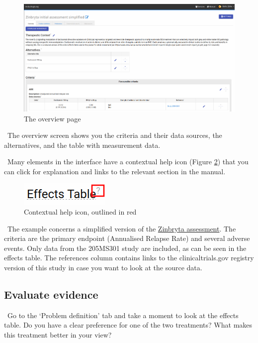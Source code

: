 \documentclass[00_mcda_tutorial.tex]{subfiles}
\begin{document}
\begin{figure}[!h]
  \centering
  \includegraphics[width=\textwidth]{fig/overviewPage.png}
  \caption{The overview page}
  \label{fig:overview_page}
\end{figure}

\noindent \faGraduationCap \, The overview screen shows you the criteria and their data sources, the alternatives, and the table with measurement data.
\newline

\noindent \faLightbulbO \, Many elements in the interface have a contextual help icon (Figure \ref{fig:tooltip}) that you can click for explanation and links to the relevant section in the manual.
\newline

\begin{figure}[!h]
  \centering
  \includegraphics[width=.3\textwidth]{fig/contextHelp.png}
  \caption{Contextual help icon, outlined in red}
  \label{fig:tooltip}
\end{figure}

\noindent \faGraduationCap \, The example concerns a simplified version of the \href{https://www.ema.europa.eu/en/medicines/human/EPAR/zinbryta#authorisation-details-section}{Zinbryta assessment}. The criteria are the primary endpoint (Annualised Relapse Rate) and several adverse events. Only data from the 205MS301 study are included, as can be seen in the effects table. The references column contains links to the clinicaltrials.gov registry version of this study in case you want to look at the source data.

\subsection*{Evaluate evidence}
\leftpointright \, Go to the ‘Problem definition’ tab and take a moment to look at the effects table. Do you have a clear preference for one of the two treatments? What makes this treatment better in your view?
\newline
\end{document}
